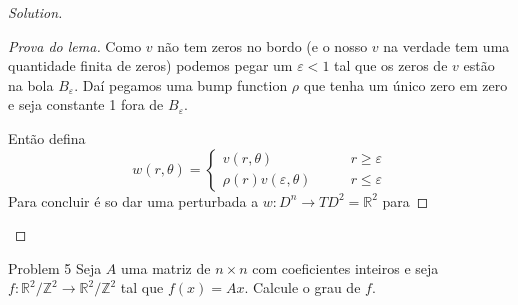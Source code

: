 \begin{proof}[Solution]
\begin{proof}[Prova do lema]\leavevmode
Como \(v\) não tem zeros no bordo (e o nosso \(v\) na verdade tem uma quantidade finita de zeros) podemos pegar um \(\varepsilon<1\) tal que os zeros de \(v\) estão na bola \(B_\varepsilon\). Daí pegamos uma bump function \(\rho\) que tenha um único zero em zero e seja constante 1 fora de \(B_\varepsilon\).

Então defina
\[w(r,\theta)=\begin{cases}
	v(r,\theta)\qquad &r \geq \varepsilon \\
	\rho(r)v(\varepsilon,\theta)\qquad &r \leq \varepsilon
\end{cases}\]
Para concluir é so dar uma perturbada a \(w:D^n \to TD^2=\mathbb{R}^2\) para 
\end{proof}

\end{proof}

\begin{thing1}{Problem 5}\label{prob:5}\leavevmode
Seja \(A\) uma matriz de \(n \times n\) com coeficientes inteiros e seja \(f:\mathbb{R}^2/\mathbb{Z}^2 \to \mathbb{R}^2/\mathbb{Z}^2\) tal que \(f(x)=Ax\). Calcule o grau de \(f\).
\end{thing1}

